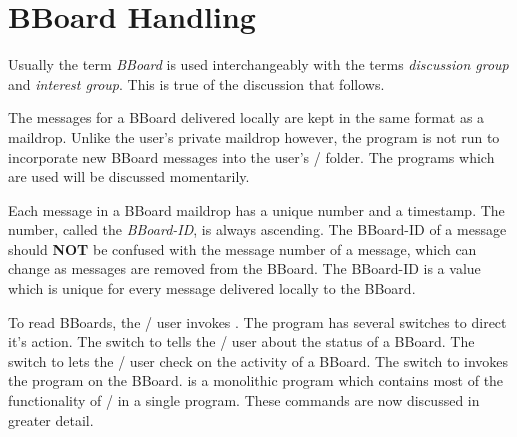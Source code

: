 \section{BBoard Handling}
Usually the term {\it BBoard} is used interchangeably with the terms
{\it discussion group} and {\it interest group}.
This is true of the discussion that follows.

The messages for a BBoard delivered locally are kept in the same format as
a maildrop.%
Unlike the user's private maildrop however,
the  program is not run to incorporate new BBoard messages into
the user's \MH/  folder.
The programs which are used will be discussed momentarily.

Each message in a BBoard maildrop has a unique number and a timestamp.
The number, called the {\it BBoard-ID}, is always ascending.
The BBoard-ID of a message should {\bf NOT} be confused with the message
number of a message, which can change as messages are removed from the BBoard.
The BBoard-ID is a value which is unique for every message delivered locally
to the BBoard.

To read BBoards, the \MH/ user invokes .
The  program has several switches to direct it's action.
The  switch to  tells the \MH/ user about the
status of a BBoard.
The  switch to  lets the \MH/ user check on the
activity of a BBoard.
The  switch to  invokes the  program on the
BBoard.
 is a monolithic program which contains most of the functionality of
\MH/ in a single program.
These commands are now discussed in greater detail.

